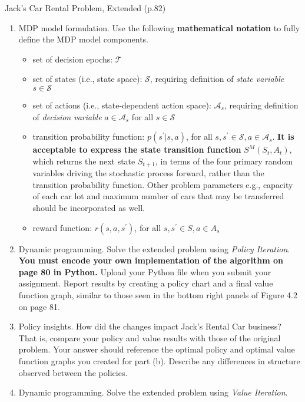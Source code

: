 \documentclass[12pt,letterpaper]{exam}
\begin{document}
\begin{questions}
	\setcounter{question}{6}
	\question%
	Jack's Car Rental Problem, Extended (p.82)
	\begin{enumerate}[label= (\alph*)]
		\item 
		MDP model formulation. 
		Use the following \textbf{mathematical notation} to fully define the MDP model components.
		\begin{itemize}
			\item set of decision epochs: \(\mathcal{T}\)
			\item set of states (i.e., state space): \(\mathcal{S}\), 
			requiring definition of \emph{state variable} \(s \in \mathcal{S}\)
			\item set of actions (i.e., state-dependent action space): \(\mathcal{A}_s\), 
			requiring definition of \emph{decision variable} \(a\in\mathcal{A}_s\) for all \(s\in\mathcal{S}\)
			\item transition probability function: \(p(s^\prime|s, a)\), 
			for all \(s, s^\prime \in \mathcal{S}, a \in \mathcal{A}_s\). 
			\textbf{It is acceptable to express the state transition function} \(S^M(S_t, A_t)\), 
			which returns the next state \(S_{t+1}\), in terms of the four primary random variables driving the stochastic process forward, 
			rather than the transition probability function. Other problem parameters \- e.g., capacity of each car lot
			and maximum number of cars that may be transferred \- should be incorporated as well.
			\item reward function: \(r(s, a, s^\prime)\), for all \(s, s^\prime \in S, a \in A_s\)
		\end{itemize}
		\item 
		Dynamic programming. Solve the extended problem using \emph{Policy Iteration}. 
		\textbf{You must encode your own implementation of the algorithm on page 80 in Python.} 
		Upload your Python file when you submit your assignment. 
		Report results by creating a policy chart and a final value function graph, 
		similar to those seen in the bottom right panels of Figure 4.2 on page 81.
		\item 
		Policy insights. How did the changes impact Jack's Rental Car business? That is, compare
		your policy and value results with those of the original problem. Your answer should reference
		the optimal policy and optimal value function graphs you created for part (b). Describe any
		differences in structure observed between the policies.
		\item 
		Dynamic programming. Solve the extended problem using \emph{Value Iteration}. 

\end{enumerate}
\end{questions}
\end{document}

